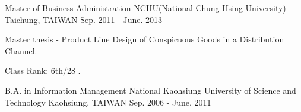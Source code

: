 

\begin{cventries}

  \cventry
    {Master of Business Administration} %
    {NCHU(National Chung Hsing University)} %
    {Taichung, TAIWAN} %
    {Sep. 2011 - June. 2013} %
    {
      \begin{cvitems} %
        \item {Master thesis - Product Line Design of Conspicuous Goods in a Distribution Channel.}
      \end{cvitems}
      \begin{cvitems} %
        \item {Class Rank: 6th/28 .}
      \end{cvitems}
    }



  \cventry
    {B.A. in Information Management} %
    {National Kaohsiung University of Science and Technology} %
    {Kaohsiung, TAIWAN} %
    {Sep. 2006 - June. 2011} %
    {
    }

\end{cventries}
